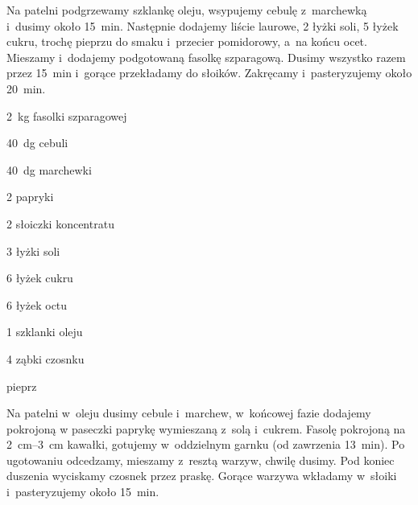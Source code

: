 \documentclass[../main.tex]{subfiles}
\begin{document}
Na patelni podgrzewamy szklankę oleju, wsypujemy cebulę z~marchewką i~dusimy
około \qty{15}{\minute}. Następnie dodajemy liście laurowe, \num{2} łyżki soli,
\num{5} łyżek cukru, trochę pieprzu do smaku i~przecier pomidorowy, a~na końcu
ocet. Mieszamy i~dodajemy podgotowaną fasolkę szparagową. Dusimy wszystko razem
przez \qty{15}{\minute} i~gorące przekładamy do słoików. Zakręcamy
i~pasteryzujemy około \qty{20}{\minute}.


\begin{Ingred}
    \item \qty{2}{\kilo\gram} fasolki szparagowej
    \item \qty{40}{\deka\gram} cebuli
    \item \qty{40}{\deka\gram} marchewki
    \item \num{2} papryki
    \item \num{2} słoiczki koncentratu
    \item \num{3} łyżki soli
    \item \num{6} łyżek cukru
    \item \num{6} łyżek octu
    \item \num{1} szklanki oleju
    \item \num{4} ząbki czosnku
    \item pieprz
\end{Ingred}

Na patelni w~oleju dusimy cebule i~marchew, w~końcowej fazie dodajemy pokrojoną
w paseczki paprykę wymieszaną z~solą i~cukrem. Fasolę pokrojoną na
\qtyrange{2}{3}{\centi\metre} kawałki, gotujemy w~oddzielnym garnku (od
zawrzenia \qty{13}{\minute}). Po ugotowaniu odcedzamy, mieszamy z~resztą
warzyw, chwilę dusimy. Pod koniec duszenia wyciskamy czosnek przez praskę.
Gorące warzywa wkładamy w~słoiki i~pasteryzujemy około \qty{15}{\minute}.
\end{document}

